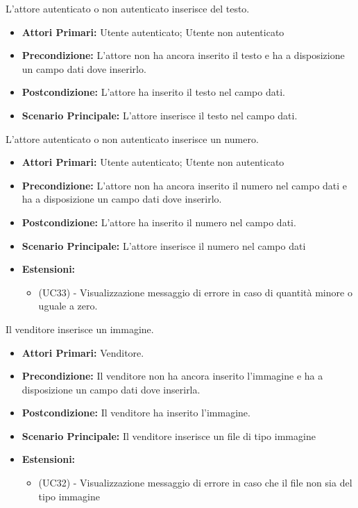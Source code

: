 L'attore autenticato o non autenticato inserisce del testo.
\begin{itemize}
    \item \textbf{Attori Primari:} Utente autenticato; Utente non autenticato
    \item \textbf{Precondizione:} L'attore non ha ancora inserito il testo e ha a disposizione un campo dati dove inserirlo.
    \item \textbf{Postcondizione:} L'attore ha inserito il testo nel campo dati.
    \item \textbf{Scenario Principale:} L'attore inserisce il testo nel campo dati.
\end{itemize}

L'attore autenticato o non autenticato inserisce un numero.
\begin{itemize}
    \item \textbf{Attori Primari:} Utente autenticato; Utente non autenticato
    \item \textbf{Precondizione:} L'attore non ha ancora inserito il numero nel campo dati e ha a disposizione un campo dati dove inserirlo.
    \item \textbf{Postcondizione:} L'attore ha inserito il numero nel campo dati.
    \item \textbf{Scenario Principale:} L'attore inserisce il numero nel campo dati
    \item \textbf{Estensioni:}
    \begin{itemize}
        \item (UC33) - Visualizzazione messaggio di errore in caso di quantità minore o uguale a zero.
    \end{itemize}
\end{itemize}

Il venditore inserisce un immagine.
\begin{itemize}
    \item \textbf{Attori Primari:} Venditore.
    \item \textbf{Precondizione:} Il venditore non ha ancora inserito l'immagine e ha a disposizione un campo dati dove inserirla.
    \item \textbf{Postcondizione:} Il venditore ha inserito l'immagine.
    \item \textbf{Scenario Principale:} Il venditore inserisce un file di tipo immagine
    \item \textbf{Estensioni:}
    \begin{itemize}
        \item (UC32) - Visualizzazione messaggio di errore in caso che il file non sia del tipo immagine
    \end{itemize}
\end{itemize}
